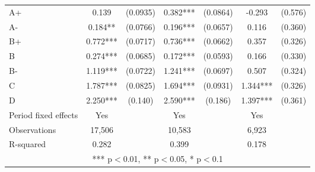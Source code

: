 \documentclass[12pt]{article}
\begin{document}
\begin{table}[H]
{\begin{tabular}{lcccccc}
    A+ & 0.139 & (0.0935) & 0.382*** & (0.0864) & -0.293 & (0.576) \\
    A- & 0.184** & (0.0766) & 0.196*** & (0.0657) & 0.116 & (0.360) \\
    B+ & 0.772*** & (0.0717) & 0.736*** & (0.0662) & 0.357 & (0.326) \\
    B & 0.274*** & (0.0685) & 0.172*** & (0.0593) & 0.166 & (0.330) \\
    B- & 1.119*** & (0.0722) & 1.241*** & (0.0697) & 0.507 & (0.324) \\
    C & 1.787*** & (0.0825) & 1.694*** & (0.0931) & 1.344*** & (0.326) \\
    D & 2.250*** & (0.140) & 2.590*** & (0.186) & 1.397*** & (0.361) \\
    \midrule
    Period fixed effects & Yes & & Yes & & Yes & \\
    Observations & 17,506 & & 10,583 & & 6,923 & \\
    R-squared & 0.282 & & 0.399 & & 0.178 & \\
    \bottomrule
    \multicolumn{7}{c}{*** p$<$0.01, ** p$<$0.05, * p$<$0.1} \\
    \end{tabular}%
    }
\end{table}
\end{document}
